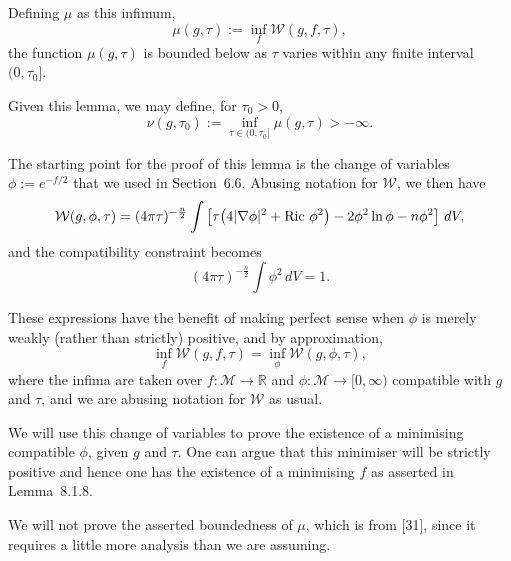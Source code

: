 Defining $\mu$ as this infimum,
\[
\mu(g,\tau):=\inf_f \mathcal W(g,f,\tau),
\]
the function $\mu(g,\tau)$ is bounded below as $\tau$ varies within any finite
interval $(0,\tau_0]$.

Given this lemma, we may define, for $\tau_0>0$,
\[
\nu(g,\tau_0):=\inf_{\tau\in(0,\tau_0]}\mu(g,\tau)>-\infty.
\]

The starting point for the proof of this lemma is the change of variables
$\phi:=e^{-f/2}$ that we used in Section~6.6. Abusing notation for
$\mathcal W$, we then have
\[
\mathcal W(g,\phi,\tau)
=(4\pi\tau)^{-\frac{n}{2}}
\int \left[\tau\!\left(4|\nabla\phi|^2+\operatorname{Ric}\,\phi^2\right)-2\phi^2\ln\phi-n\phi^2\right]\,dV,
\]
and the compatibility constraint becomes
\[
(4\pi\tau)^{-\frac{n}{2}} \int \phi^2\,dV = 1.
\]

These expressions have the benefit of making perfect sense when $\phi$ is
merely weakly (rather than strictly) positive, and by approximation,
\[
\inf_f \mathcal W(g,f,\tau) = \inf_\phi \mathcal W(g,\phi,\tau),
\]
where the infima are taken over $f : \mathcal M \to \mathbb R$ and
$\phi : \mathcal M \to [0,\infty)$ compatible with $g$ and $\tau$, and we are
abusing notation for $\mathcal W$ as usual.

We will use this change of variables to prove the existence of a minimising
compatible $\phi$, given $g$ and $\tau$. One can argue that this minimiser will
be strictly positive and hence one has the existence of a minimising $f$ as
asserted in Lemma~8.1.8.

We will not prove the asserted boundedness of $\mu$, which is from [31], since
it requires a little more analysis than we are assuming.


